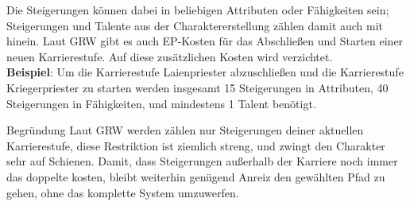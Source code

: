 \documentclass[a4paper,10pt,twoside,twocolumn,openany,nodeprecatedcode,bg=print]{dndbook}
\begin{document}
Die Steigerungen können dabei in beliebigen Attributen oder Fähigkeiten sein; Steigerungen und Talente aus der Charaktererstellung zählen damit auch mit hinein.
Laut GRW gibt es auch EP-Kosten für das Abschließen und Starten einer neuen Karrierestufe. Auf diese zusätzlichen Kosten wird verzichtet.\\

\textbf{Beispiel}: Um die Karrierestufe Laienpriester abzuschließen und die Karrierestufe Kriegerpriester zu starten werden insgesamt 15 Steigerungen in Attributen, 40 Steigerungen in Fähigkeiten, und mindestens 1 Talent benötigt.

\begin{DndComment}{Begründung}
  Laut GRW werden zählen nur Steigerungen deiner aktuellen Karrierestufe, diese Restriktion ist ziemlich streng, und zwingt den Charakter sehr auf Schienen. Damit, dass Steigerungen außerhalb der Karriere noch immer das doppelte kosten, bleibt weiterhin genügend Anreiz den gewählten Pfad zu gehen, ohne das komplette System umzuwerfen.
\end{DndComment}


\clearpage


\end{document}

